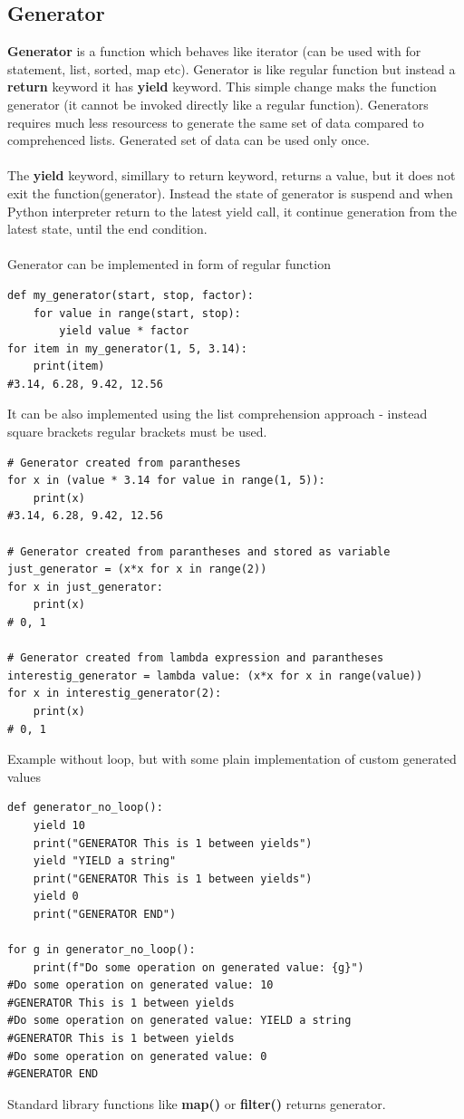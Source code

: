 \documentclass{article}
\begin{document}
\subsection{Generator}
\textbf{Generator} is a function which behaves like iterator (can be used with for statement, list, sorted, map etc). Generator is like regular function but instead a \textbf{return} keyword it has \textbf{yield} keyword. This simple change maks the function generator (it cannot be invoked directly like a regular function). Generators requires much less resourcess to generate the same set of data compared to comprehenced lists. Generated set of data can be used only once.
\paragraph{}
The \textbf{yield} keyword, simillary to return keyword, returns a value, but it does not exit the function(generator). Instead the state of generator is suspend and when Python interpreter return to the latest yield call, it continue generation from the latest state, until the end condition.
\paragraph{}
Generator can be implemented in form of regular function
\begin{lstlisting}[style=pystyle]
def my_generator(start, stop, factor):
	for value in range(start, stop):
		yield value * factor
for item in my_generator(1, 5, 3.14):
	print(item)
#3.14, 6.28, 9.42, 12.56
\end{lstlisting}
It can be also implemented using the list comprehension approach - instead square brackets regular brackets must be used.
\begin{lstlisting}[style=pystyle]
# Generator created from parantheses
for x in (value * 3.14 for value in range(1, 5)):
	print(x)
#3.14, 6.28, 9.42, 12.56

# Generator created from parantheses and stored as variable
just_generator = (x*x for x in range(2))
for x in just_generator:
    print(x)
# 0, 1

# Generator created from lambda expression and parantheses
interestig_generator = lambda value: (x*x for x in range(value))
for x in interestig_generator(2):
    print(x)
# 0, 1
\end{lstlisting}
Example without loop, but with some plain implementation of custom generated values
\begin{lstlisting}[style=pystyle]
def generator_no_loop():
    yield 10
    print("GENERATOR This is 1 between yields")
    yield "YIELD a string"
    print("GENERATOR This is 1 between yields")
    yield 0
    print("GENERATOR END")
    
for g in generator_no_loop():
    print(f"Do some operation on generated value: {g}")
#Do some operation on generated value: 10
#GENERATOR This is 1 between yields
#Do some operation on generated value: YIELD a string
#GENERATOR This is 1 between yields
#Do some operation on generated value: 0
#GENERATOR END
\end{lstlisting}
Standard library functions like \textbf{map()} or \textbf{filter()} returns generator.
\end{document}
